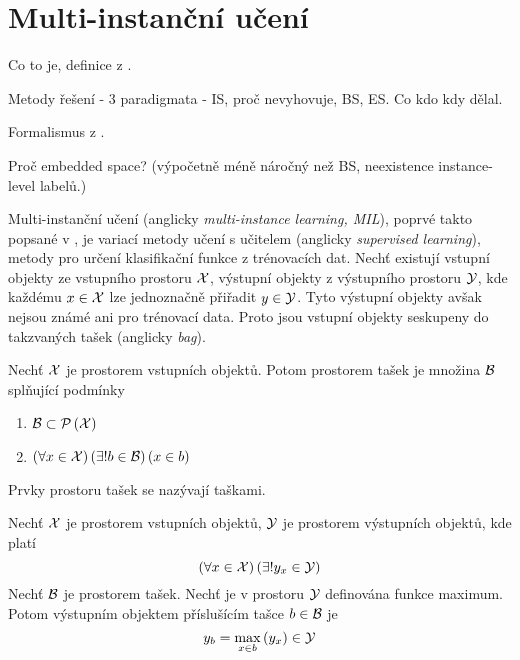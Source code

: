 \chapter{Multi-instanční učení}\label{MIL}

Co to je, definice z \cite{dietterich_solving_1997}.

Metody řešení - 3 paradigmata - IS, proč nevyhovuje, BS, ES. Co kdo kdy dělal.

Formalismus z \cite{pevny_using_2016}.

Proč embedded space? (výpočetně méně náročný než BS, neexistence instance-level labelů.)

Multi-instanční učení (anglicky \textenglish{\textit{multi-instance learning, MIL}}), poprvé takto popsané v \cite{dietterich_solving_1997}, je variací metody učení s učitelem (anglicky \textenglish{\textit{supervised learning}}), metody pro určení klasifikační funkce z trénovacích dat. Nechť existují vstupní objekty ze vstupního prostoru \( \mathcal X \), výstupní objekty z výstupního prostoru \( \mathcal Y \), kde každému \( x \in \mathcal X \) lze jednoznačně přiřadit \( y \in \mathcal Y \). Tyto výstupní objekty avšak nejsou známé ani pro trénovací data. Proto jsou vstupní objekty seskupeny do takzvaných tašek (anglicky \textenglish{\textit{bag}}).
\begin{define}
	Nechť \( \mathcal X \) je prostorem vstupních objektů. Potom prostorem tašek je množina \( \mathcal B \) splňující podmínky
	\begin{enumerate}
		\item \( \mathcal B \subset \mathcal P \left( \mathcal X \right) \)
		\item \( \left( \forall x \in \mathcal X \right) \left( \exists ! b \in \mathcal B \right) \left( x \in b \right) \)
	\end{enumerate}
	Prvky prostoru tašek se nazývají taškami.
\end{define}
\begin{define}\label{baglabel}
	Nechť \( \mathcal X \) je prostorem vstupních objektů, \( \mathcal Y \) je prostorem výstupních objektů, kde platí
	\[ \left( \forall x \in \mathcal X \right) \left( \exists ! y_x \in \mathcal Y \right) \]
	Nechť \( \mathcal B \) je prostorem tašek. Nechť je v prostoru \( \mathcal Y \) definována funkce maximum. Potom výstupním objektem příslušícím tašce \( b \in \mathcal B \) je
	\[ y_b = \max_{x \in b} \left( y_x \right) \in \mathcal Y \]
\end{define}

